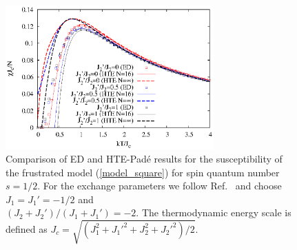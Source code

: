 \documentclass[aps,twocolumn,groupedaddress]{revtex4}
\begin{document}
\begin{figure}
\begin{center}
\includegraphics[clip=on,width=80mm,angle=0]{fig7.eps}
\end{center}
\caption{Comparison of ED and HTE-Pad\'e results for the susceptibility of the
frustrated model (\ref{model_square}) for spin quantum number $s=1/2$. For
the exchange parameters we follow Ref.~ and choose
$J_1=J_1'=-1/2$ and\\ $(J_2+J_2')/(J_1+J_1')=-2$.
The thermodynamic energy scale is defined as
$J_c=\sqrt{(J_1^2+J_1'^2+J_2^2+J_2'^2)/2}$.
}
\label{vgl_tsirlin}
\end{figure}
\end{document}
